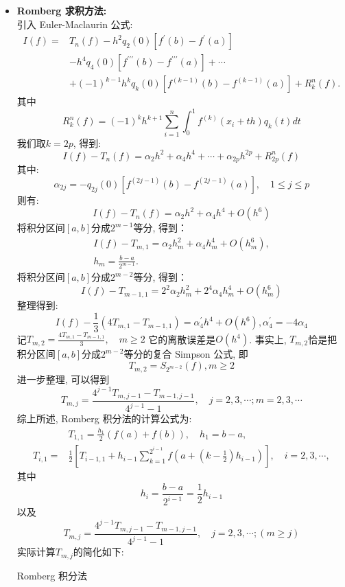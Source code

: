 \documentclass[UTF8,ctexart,a4paper,11pt,openany]{article}
\theoremstyle{definition}
\begin{document}
\begin{itemize}
            \item \textbf{Romberg 求积方法: } \\ 引入 Euler-Maclaurin 公式: $$\begin{aligned} I(f)= & T_{n}(f)-h^{2} q_{2}(0)\left[f^{\prime}(b)-f^{\prime}(a)\right] \\ & -h^{4} q_{4}(0)\left[f^{\prime \prime \prime}(b)-f^{\prime \prime \prime}(a)\right]+\cdots \\ & +(-1)^{k-1} h^{k} q_{k}(0)\left[f^{(k-1)}(b)-f^{(k-1)}(a)\right]+R_{k}^{n}(f) .\end{aligned}$$ 其中 $$R_{k}^{n}(f)=(-1)^{k} h^{k+1} \sum_{i=1}^{n} \int_{0}^{1} f^{(k)}\left(x_{i}+t h\right) q_{k}(t) d t$$我们取$k=2p$, 得到: $$I(f)-T_{n}(f)=\alpha_{2} h^{2}+\alpha_{4} h^{4}+\cdots+\alpha_{2 p} h^{2 p}+R_{2 p}^{n}(f)$$ 其中: $$\alpha_{2 j}=-q_{2 j}(0)\left[f^{(2 j-1)}(b)-f^{(2 j-1)}(a)\right], \quad 1 \leq j \leq p$$ 则有: $$I(f)-T_{n}(f)=\alpha_{2} h^{2}+\alpha_{4} h^{4}+O\left(h^{6}\right)$$ 将积分区间$[a, b]$分成$2^{m-1}$等分, 得到：$$\begin{array}{c}I(f)-T_{m, 1}=\alpha_{2} h_{m}^{2}+ \alpha_{4} h_{m}^{4}+ O\left(h_{m}^{6}\right), \\ h_{m}=\frac{b-a}{2^{m-1}} .\end{array}$$ 将积分区间$[a, b]$分成$2^{m-2}$等分, 得到：$$I(f)-T_{m-1,1}=2^{2} \alpha_{2} h_{m}^{2}+2^{4} \alpha_{4} h_{m}^{4}+O\left(h_{m}^{6}\right)$$ 整理得到: $$I(f)-\frac{1}{3}\left(4 T_{m, 1}-T_{m-1,1}\right)=\alpha_{4}^{\prime} h^{4}+O\left(h^{6}\right), \alpha_{4}^{\prime}=-4 \alpha_{4}$$ 记$T_{m, 2}=\frac{4 T_{m, 1}-T_{m-1,1}}{3}, \quad m \geq 2$ 它的离散误差是$O(h^4)$. 事实上, $T_{m,2}$恰是把积分区间$[a, b]$分成$2^{m-2}$等分的复合 Simpson 公式, 即$$T_{m,2}=S_{2^{m-2}}(f), m\geqslant 2$$进一步整理, 可以得到$$T_{m, j}=\frac{4^{j-1} T_{m, j-1}-T_{m-1, j-1}}{4^{j-1}-1}, \quad j=2,3, \cdots ; m=2,3, \cdots$$综上所述, Romberg 积分法的计算公式为: $$\begin{aligned} & T_{1,1}=\frac{h_{1}}{2}(f(a)+f(b)), \quad h_{1}=b-a, \\ T_{i, 1}= & \frac{1}{2}\left[T_{i-1,1}+h_{i-1} \sum_{k=1}^{2^{i-1}} f\left(a+\left(k-\frac{1}{2}\right) h_{i-1}\right)\right], \quad i=2,3, \cdots,\end{aligned}$$ 其中$$h_{i}=\frac{b-a}{2^{i-1}}=\frac{1}{2} h_{i-1}$$ 以及$$T_{m, j}=\frac{4^{j-1} T_{m, j-1}-T_{m-1, j-1}}{4^{j-1}-1}, \quad j=2,3, \cdots ;(m \geq j)$$实际计算$T_{m,j}$的简化如下:     
            \begin{algorithm}[H]
                \caption{Romberg 积分法}

\end{algorithm}
\end{itemize}
\end{document}
